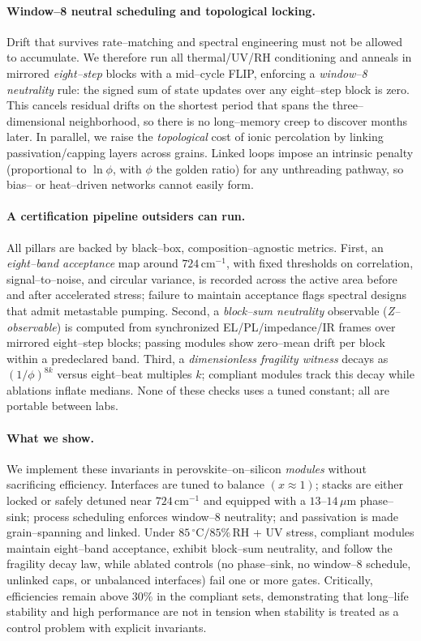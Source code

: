 \documentclass[12pt]{article}
\begin{document}
\paragraph{Window–8 neutral scheduling and topological locking.}
Drift that survives rate–matching and spectral engineering must not be allowed to accumulate. We therefore run all thermal/UV/RH conditioning and anneals in mirrored \emph{eight–step} blocks with a mid–cycle FLIP, enforcing a \emph{window–8 neutrality} rule: the signed sum of state updates over any eight–step block is zero. This cancels residual drifts on the shortest period that spans the three–dimensional neighborhood, so there is no long–memory creep to discover months later. In parallel, we raise the \emph{topological} cost of ionic percolation by linking passivation/capping layers across grains. Linked loops impose an intrinsic penalty (proportional to $\ln\phi$, with $\phi$ the golden ratio) for any unthreading pathway, so bias– or heat–driven networks cannot easily form.

\paragraph{A certification pipeline outsiders can run.}
All pillars are backed by black–box, composition–agnostic metrics. First, an \emph{eight–band acceptance} map around $724\,\mathrm{cm}^{-1}$, with fixed thresholds on correlation, signal–to–noise, and circular variance, is recorded across the active area before and after accelerated stress; failure to maintain acceptance flags spectral designs that admit metastable pumping. Second, a \emph{block–sum neutrality} observable (\emph{Z–observable}) is computed from synchronized EL/PL/impedance/IR frames over mirrored eight–step blocks; passing modules show zero–mean drift per block within a predeclared band. Third, a \emph{dimensionless fragility witness} decays as $(1/\phi)^{8k}$ versus eight–beat multiples $k$; compliant modules track this decay while ablations inflate medians. None of these checks uses a tuned constant; all are portable between labs.

\paragraph{What we show.}
We implement these invariants in perovskite–on–silicon \emph{modules} without sacrificing efficiency. Interfaces are tuned to balance $(x\!\approx\!1)$; stacks are either locked or safely detuned near $724\,\mathrm{cm}^{-1}$ and equipped with a $13$–$14\,\mu\mathrm{m}$ phase–sink; process scheduling enforces window–8 neutrality; and passivation is made grain–spanning and linked. Under $85\,^{\circ}\mathrm{C}/85\%\,\mathrm{RH}$ + UV stress, compliant modules maintain eight–band acceptance, exhibit block–sum neutrality, and follow the fragility decay law, while ablated controls (no phase–sink, no window–8 schedule, unlinked caps, or unbalanced interfaces) fail one or more gates. Critically, efficiencies remain above $30\%$ in the compliant sets, demonstrating that long–life stability and high performance are not in tension when stability is treated as a control problem with explicit invariants.
\end{document}
